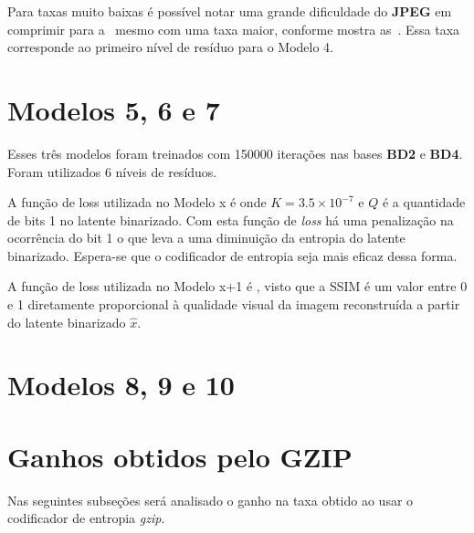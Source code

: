 Para taxas muito baixas é possível notar uma grande dificuldade do \textbf{JPEG} em comprimir para a~ mesmo com uma taxa maior, conforme mostra as~. Essa taxa corresponde ao primeiro nível de resíduo para o Modelo 4.

\section{Modelos 5, 6 e 7}
\label{res:6levels}
Esses três modelos foram treinados com 150000 iterações nas bases \textbf{BD2} e \textbf{BD4}. Foram utilizados 6 níveis de resíduos. 

A função de loss utilizada no Modelo x é  onde $K = 3.5 \times 10^{-7}$ e $Q$ é a quantidade de bits 1 no latente binarizado. Com esta função de \textit{loss} há uma penalização na ocorrência do bit 1 o que leva a uma diminuição da entropia do latente binarizado. Espera-se que o codificador de entropia seja mais eficaz dessa forma.

A função de loss utilizada no Modelo x+1 é , visto que a \acrshort{SSIM} é um valor entre 0 e 1 diretamente proporcional à qualidade visual da imagem reconstruída a partir do latente binarizado $\hat{x}$.  
\section{Modelos 8, 9 e 10}

\section{Ganhos obtidos pelo GZIP}
\label{res:gzip}
Nas seguintes subseções será analisado o ganho na taxa obtido ao usar o codificador de entropia \textit{gzip}.
